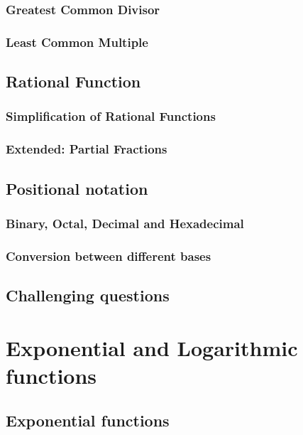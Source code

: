 \documentclass[12pt]{article}
\begin{document}
    \subsubsection{Greatest Common Divisor}

    \subsubsection{Least Common Multiple}

    \subsection{Rational Function}

    \subsubsection{Simplification of Rational Functions}

    \subsubsection{Extended: Partial Fractions}

    \subsection{Positional notation}

    \subsubsection{Binary, Octal, Decimal and Hexadecimal}

    \subsubsection{Conversion between different bases}

    \subsection{Challenging questions}

    \newpage

    \section{Exponential and Logarithmic functions}

    \subsection{Exponential functions}
\end{document}
